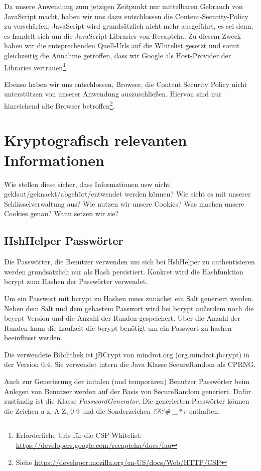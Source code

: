 \documentclass[12pt,DIV14,BCOR10mm,a4paper,twoside,parskip=half-,headsepline,headinclude,english,ngerman,bibliography=totocnumbered]{scrreprt}
\begin{document}
Da unsere Anwendung zum jetzigen Zeitpunkt nur mittelbaren Gebrauch von JavaScript macht, haben wir uns dazu entschlossen die Content-Security-Policy zu verschärfen: JavaScript wird grundsätzlich nicht mehr ausgeführt, es sei denn, es handelt sich um die JavaScript-Libraries von Recaptcha. Zu diesem Zweck haben wir die entsprechenden Quell-Urls auf die Whitelist gesetzt und somit gleichzeitig die Annahme getroffen, dass wir Google als Host-Provider der Libraries vertrauen\footnote{Erforderliche Urls für die CSP Whitelist: \url{https://developers.google.com/recaptcha/docs/faq}}.

Ebenso haben wir uns entschlossen, Browser, die Content Security Policy nicht unterstützen von unserer Anwendung auszuschließen. Hiervon sind nur hinreichend alte Browser betroffen\footnote{Siehe  \url{https://developer.mozilla.org/en-US/docs/Web/HTTP/CSP}}.

\section{Kryptografisch relevanten Informationen}

Wie stellen diese sicher, dass Informationen usw nicht geklaut/geknackt/abgehört/entwendet werden können?
Wie sieht es mit unserer Schlässelverwaltung aus?
Wie nutzen wir unsere Cookies? Was machen unsere Cookies genau?
Wann setzen wir sie?


\subsection{HshHelper Passwörter}
Die Passwörter, die Benutzer verwenden um sich bei HshHelper zu authentisieren werden grundsätzlich nur als Hash persistiert. Konkret wird die Hashfunktion bcrypt zum Hashen der Passwörter verwendet.

Um ein Passwort mit bcrypt zu Hashen muss zunächst ein Salt generiert werden. Neben dem Salt und dem gehastem Passwort wird bei bcrypt außerdem noch die bcyrpt Version und die Anzahl der Runden gespeichert. Über die Anzahl der Runden kann die Laufzeit die bcrypt benötigt um ein Passwort zu hashen beeinflusst werden.

Die verwendete Bibilithek ist jBCrypt von mindrot.org (org.mindrot.jbcrypt) in der Version 0.4. Sie verwendet intern die Java Klasse SecureRandom als CPRNG.

Auch zur Generierung der initalen (und temporären) Benutzer Passwörter beim Anlegen von Benutzer werden auf der Basis von SecureRandom generiert. Dafür zuständig ist die Klasse \textit{PasswordGenerator}. Die generierten Passwörter können die Zeichen a-z, A-Z, 0-9 und die Sonderzeichen \textit{!\%?\#-\_*+} enthalten.
\end{document}
